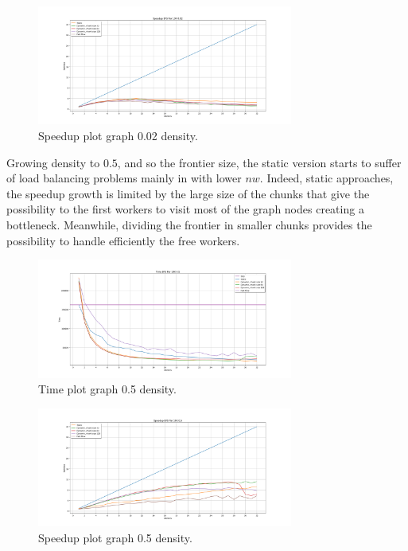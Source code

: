 \begin{figure}[htb!]
    \centering
    \includegraphics[width=0.75\textwidth]{Figures/plot_map_speedup_vs10K002.png}
    \caption{Speedup plot graph 0.02 density.}
    \label{fig:plot_speedup_10k_002}
\end{figure}
\FloatBarrier
Growing density to $0.5$, and so the frontier size, the static version starts to suffer of load balancing problems mainly in with lower $nw$. Indeed, static approaches, the speedup growth is limited by the large size of the chunks that give the possibility to the first workers to visit most of the graph nodes creating a bottleneck. Meanwhile, dividing the frontier in smaller chunks provides the possibility to handle efficiently the free workers. 

\begin{figure}[htb!]
    \centering
    \includegraphics[width=0.75\textwidth]{Figures/plot_map_time_vs10K05.png}
    \caption{Time plot graph 0.5 density.}
    \label{fig:plot_time_10k_05}
\end{figure}
\FloatBarrier

\begin{figure}[htb!]
    \centering
    \includegraphics[width=0.75\textwidth]{Figures/plot_map_speedup_vs10K05.png}
    \caption{Speedup plot graph 0.5 density.}
    \label{fig:plot_speedup_10k_05}
\end{figure}
\FloatBarrier

